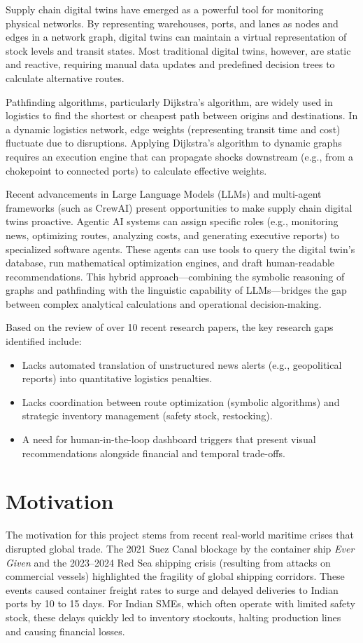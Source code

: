 Supply chain digital twins have emerged as a powerful tool for monitoring physical networks. By representing warehouses, ports, and lanes as nodes and edges in a network graph, digital twins can maintain a virtual representation of stock levels and transit states. Most traditional digital twins, however, are static and reactive, requiring manual data updates and predefined decision trees to calculate alternative routes.

Pathfinding algorithms, particularly Dijkstra's algorithm, are widely used in logistics to find the shortest or cheapest path between origins and destinations. In a dynamic logistics network, edge weights (representing transit time and cost) fluctuate due to disruptions. Applying Dijkstra's algorithm to dynamic graphs requires an execution engine that can propagate shocks downstream (e.g., from a chokepoint to connected ports) to calculate effective weights.

Recent advancements in Large Language Models (LLMs) and multi-agent frameworks (such as CrewAI) present opportunities to make supply chain digital twins proactive. Agentic AI systems can assign specific roles (e.g., monitoring news, optimizing routes, analyzing costs, and generating executive reports) to specialized software agents. These agents can use tools to query the digital twin's database, run mathematical optimization engines, and draft human-readable recommendations. This hybrid approach—combining the symbolic reasoning of graphs and pathfinding with the linguistic capability of LLMs—bridges the gap between complex analytical calculations and operational decision-making.

Based on the review of over 10 recent research papers, the key research gaps identified include:
\begin{itemize}
    \item Lacks automated translation of unstructured news alerts (e.g., geopolitical reports) into quantitative logistics penalties.
    \item Lacks coordination between route optimization (symbolic algorithms) and strategic inventory management (safety stock, restocking).
    \item A need for human-in-the-loop dashboard triggers that present visual recommendations alongside financial and temporal trade-offs.
\end{itemize}

\section[Motivation]{\textbf{Motivation}}
The motivation for this project stems from recent real-world maritime crises that disrupted global trade. The 2021 Suez Canal blockage by the container ship \textit{Ever Given} and the 2023–2024 Red Sea shipping crisis (resulting from attacks on commercial vessels) highlighted the fragility of global shipping corridors. These events caused container freight rates to surge and delayed deliveries to Indian ports by 10 to 15 days. For Indian SMEs, which often operate with limited safety stock, these delays quickly led to inventory stockouts, halting production lines and causing financial losses. 

